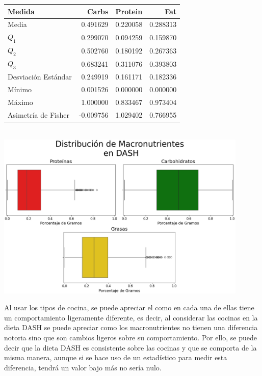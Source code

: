 \documentclass[12pt,a4paper]{article}
\begin{document}
{{{            \begin{center}
                \begin{tabular}{l|rrr}
                \toprule
                    Medida & Carbs & Protein & Fat \\
                \midrule
                    Media               & 0.491629 & 0.220058 & 0.288313 \\
                    $Q_1$               & 0.299070 & 0.094259 & 0.159870 \\
                    $Q_2$               & 0.502760 & 0.180192 & 0.267363 \\
                    $Q_3$               & 0.683241 & 0.311076 & 0.393803 \\
                    Desviación Estándar & 0.249919 & 0.161171 & 0.182336 \\
                    Mínimo              & 0.001526 & 0.000000 & 0.000000 \\
                    Máximo              & 1.000000 & 0.833467 & 0.973404 \\
                    Asimetría de Fisher & -0.009756 & 1.029402 & 0.766955 \\
                \bottomrule
                \end{tabular}\\
                \vspace{0.5cm}
                \includegraphics[width=0.9\textwidth]{Resources/EDA/Dash_1.png}
            \end{center}

            Al usar los tipos de cocina, se puede apreciar el como en cada una de 
            ellas tiene un comportamiento ligeramente diferente, es decir, al considerar 
            las cocinas en la dieta DASH se puede apreciar como los macronutrientes no 
            tienen una diferencia notoria sino que son cambios ligeros sobre su comportamiento. 
            Por ello, se puede decir que la dieta DASH es consistente sobre las cocinas y 
            que se comporta de la misma manera, aunque si se hace uso de un estadístico para 
            medir esta diferencia, tendrá un valor bajo más no sería nulo.

}}}
\end{document}
